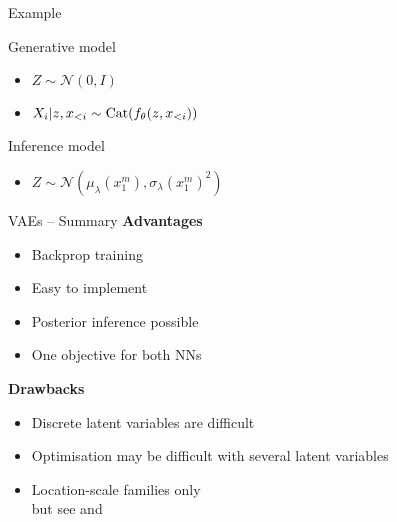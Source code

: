 \begin{frame}{Example}

	Generative model
    	\begin{itemize}
			\item $Z \sim \mathcal N(0, I)$
			\item $X_i | z, x_{<i} \sim \operatorname{Cat}(f_\theta(z, x_{<i}))$\\
    	\end{itemize}
	Inference model
    	\begin{itemize}
			\item $Z \sim \mathcal N(\mu_\lambda(x_1^m), \sigma_\lambda(x_1^m)^2)$
    	\end{itemize}
	
	
	
\end{frame}



\begin{frame}{VAEs -- Summary}
\textbf{Advantages}
\begin{itemize}
\item Backprop training
\item Easy to implement
\item Posterior inference possible
\item One objective for both NNs
\end{itemize}
\pause
\textbf{Drawbacks}
\begin{itemize}
\item Discrete latent variables are difficult
\item Optimisation may be difficult with several latent variables
\item Location-scale families only\\
but see \citet{RuizEtAl:2016} and \citet{KucukelbirEtAl:2017}
\end{itemize}
\end{frame}
